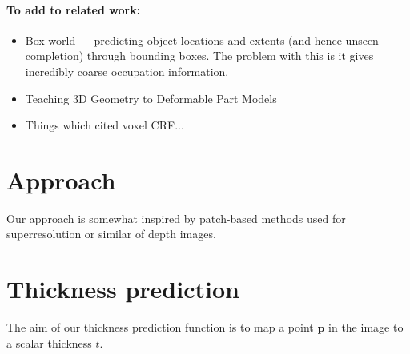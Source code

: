 \documentclass[10pt,twocolumn,letterpaper]{article}
\newcommand{\point}{\mathbf{p}}
\begin{document}
\paragraph{To add to related work:}
\begin{itemize}
\item Box world --- predicting object locations and extents (and hence unseen completion) through bounding boxes. 
The problem with this is it gives incredibly coarse occupation information.
\item Teaching 3D Geometry to Deformable Part Models
\item Things which cited voxel CRF...
\end{itemize}




\section{Approach}

Our approach is somewhat inspired by patch-based methods used for superresolution or similar of depth images. 





\section{Thickness prediction}

The aim of our thickness prediction function is to map a point $\point$ in the image to a scalar thickness $t$.
\end{document}
